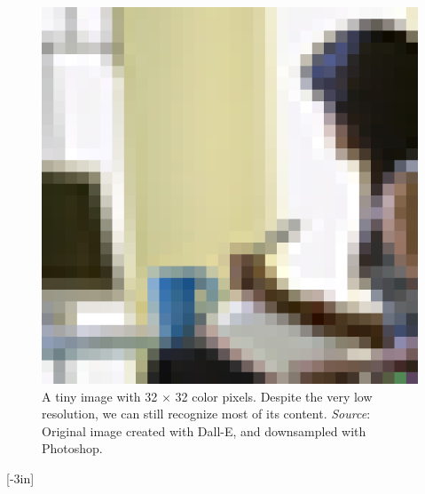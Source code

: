 \begin{figure}[h!]
\centerline{
    \includegraphics[width=.8\linewidth]{figures/visionscience/DALLE_32x32.png}
    }
    \caption{A tiny image with 32 $\times$ 32 color pixels. Despite the very low resolution, we can still recognize most of its content. {\em Source}: Original image created with Dall-E, and downsampled with Photoshop.}
    \label{fig:pexels-retha-ferguson}
\end{figure}


[-3in]

